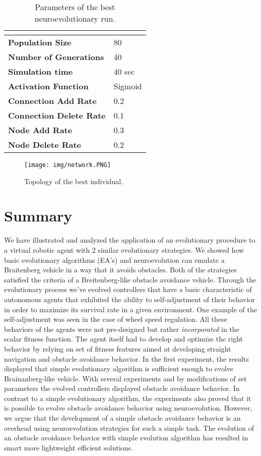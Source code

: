 \documentclass[format=acmsmall, review=false, screen=true]{acmart}
\begin{document}
\begin{table}[H]
\begin{tabular}{ll}
\hline
\textbf{}                      & \textbf{} \\ \hline
\textbf{Population Size}       & 80        \\
\textbf{Number of Generations} & 40        \\
\textbf{Simulation time}       & 40 sec    \\
\textbf{Activation Function}   & Sigmoid   \\
\textbf{Connection Add Rate}   & 0.2       \\
\textbf{Connection Delete Rate}&  0.1 	   \\
\textbf{Node Add Rate}         & 0.3       \\
\textbf{Node Delete Rate}      & 0.2       \\
\end{tabular}
\caption{Parameters of the best neuroevolutionary run.}
\label{table:neuroevolution_run}
\end{table}


\begin{figure}[H]
  \texttt{[image: img/network.PNG]}
  \caption{Topology of the best individual.}
  \label{fig:ne_topology.}
\end{figure}

\section{Summary}

We have illustrated and analyzed the application of an evolutionary procedure to a virtual robotic agent with 2 similar evolutionary strategies. We showed how basic evolutionary algorithms (EA’s) and neuroevolution can emulate a Braitenberg vehicle in a way that it avoids obstacles. Both of the strategies satisfied the criteria of a Breitenberg-like obstacle avoidance vehicle. Through the evolutionary process we've evolved controllers that have a basic characteristic of autonomous agents that exhibited the ability to self-adjustment of their behavior in order to maximize its survival rate in a given environment. One example of the self-adjustment was seen in the case of wheel speed regulation. All these behaviors of the agents were not pre-designed but rather \emph{incorporated} in the scalar fitness function. The agent itself had to develop and optimize the right behavior by relying on set of fitness features aimed at developing straight navigation and obstacle avoidance behavior. In the first experiment, the results displayed that simple evolutionary algorithm is sufficient enough to evolve Brainanberg-like vehicle. With several experiments and by modifications of set parameters the evolved controllers displayed obstacle avoidance behavior. In contrast to a simple evolutionary algorithm, the experiments also proved that it is possible to evolve obstacle avoidance behavior using neuroevolution. However, we argue that the development of a simple obstacle avoidance behavior is an overhead using neuroevolution strategies for such a simple task. The evolution of an obstacle avoidance behavior with simple evolution algorithm has resulted in smart more lightweight efficient solutions.
\end{document}
